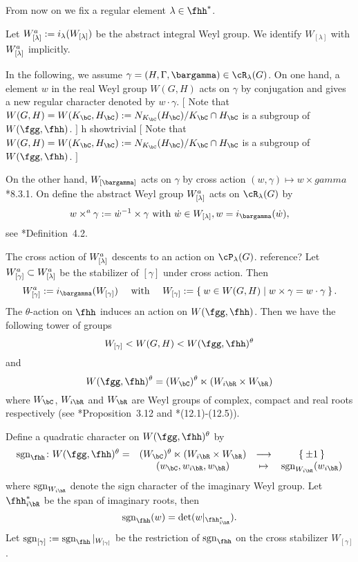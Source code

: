 \documentclass[12pt,a4paper]{amsart}
\newcommand{\trivial}[2][]{\if\relax\detokenize{#1}\relax
  {%
      \color{orange} \vspace{0em} $[$  #2 $]$
      \color{black}
  }
  \else
\ifx#1h
\ifcsname showtrivial\endcsname
{%
    \color{orange} \vspace{0em}  $[$ #2 $]$
    \color{black}
}
\fi
\else {\red Wrong argument!} \fi
\fi
}
\newcommand{\sgn}{\operatorname{sgn}}
\numberwithin{equation}{section}
\theoremstyle{remark}
\begin{document}
From now on we fix a regular element $\lambda \in \fhh^{*}$.

Let $W^a_{[\lambda]}:= i_{\lambda}(W_{[\lambda]})$ be the abstract integral Weyl group.
We identify $W_{[\lambda]}$ with $W^a_{[\lambda]}$ implicitly.

\newcommand{\cross}{\times} \newcommand{\crossa}{\times^a} In the following, we
assume $\gamma=(H,\Gamma,\bargamma)\in \cR_{\lambda}(G)$. On one hand, a element
$w$ in the real Weyl group $W(G,H)$ acts on $\gamma$ by conjugation and gives a
new regular character denoted by $w\cdot \gamma$. \trivial{ Note that
  $W(G,H) = W(K_{\bC},H_{\bC}):= N_{K_{\bC}}(H_{\bC})/K_{\bC}\cap H_{\bC}$ is a
  subgroup of $W(\fgg,\fhh)$. }

On the other hand, $W_{[\bargamma]}$ acts on $\gamma$ by cross action
$(w,\gamma)\mapsto w\times gamma$ \cite{Vg}*{8.3.1}. On define the abstract Weyl
group $W^a_{[\lambda]}$ acts on $\cR_{\lambda}(G)$ by
\[
  w \crossa \gamma := \dot{w}^{-1}\times \gamma \text{ with
  } \dot{w}\in W_{[\lambda]}, w = i_{\bargamma}(\dot{w}),
\]
see \cite{V4}*{Definition~4.2}.

The cross action of $W^a_{[\lambda]}$ descents to an action on $\cP_{\lambda}(G)$.
{\color{red} reference?} Let $W^{a}_{[\gamma]}\subset W^a_{[\lambda]}$ be the stabilizer of
$[\gamma]$ under cross action. Then
\[
  \Wa_{[\gamma]}:= i_{\bargamma}(W_{[\gamma]})
  \quad \text{ with }\quad
  W_{[\gamma]}:=\Set{w\in W(G,H)| w\times \gamma = w\cdot \gamma}.
\]
The $\theta$-action on $\fhh$ induces an action on $W(\fgg,\fhh)$. Then we have
the following tower of groups
\[
  W_{[\gamma]} < W(G,H) < W(\fgg,\fhh)^{\theta}
\]
and
\[
  W(\fgg,\fhh)^{\theta}=(\WC)^{\theta}\ltimes (\WiR\times \WR)
\]
where $\WC$, $\WiR$ and $\WR$ are Weyl groups of complex, compact and real
roots respectively (see \cite{V4}*{Proposition~3.12} and
\cite{AC}*{(12.1)-(12.5)}).


Define a quadratic character on $W(\fgg,\fhh)^{\theta}$ by
\[
  \begin{array}{rccc}
    \sgn_{\fhh}\colon  W(\fgg,\fhh)^{\theta} =
    & (\WC)^{\theta}\ltimes (\WiR\times \WR)
    & \longrightarrow & \Set{\pm 1}\\
    & (w_{\bC},w_{i\bR},w_{\bR}) & \mapsto & \sgn_{\WiR}(w_{i\bR})
  \end{array}
\]
where $\sgn_{\WiR}$ denote the sign character of the imaginary Weyl group. Let
$\fhhiR^{*}$ be the span of imaginary roots, then
\[
  \sgn_{\fhh}(w) = \det(w|_{\fhhiR^{*}}).
\]
Let $\sgn_{[\gamma]}:=\sgn_{\fhh}|_{W_{[\gamma]}}$ be the restriction of
$\sgn_{\fhh}$ on the cross stabilizer $W_{[\gamma]}$.
\end{document}
